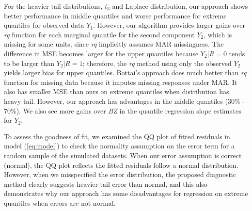 \documentclass[useAMS,usenatbib,referee]{enar}
\begin{document}
For the heavier tail distributions, $t_3$ and Laplace distribution,
our approach shows better performance in middle quantiles and worse
performance for extreme quantiles for observed data $Y_1$. However,
our algorithm provides larger gains over \textit{rq} function for each
marginal quantile for the second component $Y_2$, which is missing for
some units, since \textit{rq} implicitly assumes MAR missingness.  The
difference in MSE becomes larger for the upper quantiles because $Y_2
|R = 0$ tends to be larger than $Y_2 | R = 1$; therefore, the
\textit{rq} method using only the observed $Y_2$ yields larger bias
for upper quantiles. Bottai's approach does much better than
\textit{rq} function for missing data because it imputes missing
responses under MAR.  It also has smaller MSE than ours on extreme
quantiles when distribution has heavy tail. However, our approach has
advantages in the middle quantiles (30\% - 70\%).  We also see more
gains over \textit{BZ} in the quantile regression slope estimates for
$Y_2$.

To assess the goodness of fit, we examined the QQ plot of fitted
residuals in model (\ref{eq:model}) to check the normality assumption
on the error term for a random sample of the simulated datasets.
When our error assumption is correct
(normal), the QQ plot reflects the fitted residuals follow  a
normal distribution. However, when we misspecified the error
distribution, the proposed diagnostic method clearly suggests
heavier tail error than normal, and this also demonstrates why our
approach has some disadvantages for regression on extreme quantiles
when errors are not normal.
\end{document}
